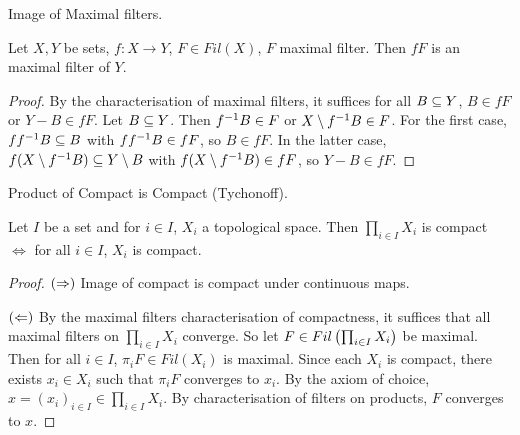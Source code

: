 \documentclass[main.tex]{subfiles}
\begin{document}
\begin{lem} Image of Maximal filters.
  
  Let $X,Y$ be sets, $f : X \to Y$, $F \in Fil(X)$, $F$ maximal filter.
  Then $f F$ is an maximal filter of $Y$. 
\end{lem}
\begin{proof}
  By the characterisation of maximal filters, 
  it suffices for all $B \subseteq Y$, $B \in fF$ or $Y\minus B \in fF$.
  Let $B \subseteq Y$.
  Then $f^{-1} B \in F$ or $X\setminus f^{-1} B \in F$.
  For the first case, $f f^{-1} B \subseteq B$ with $f f^{-1} B \in fF$,
  so $B \in fF$.
  In the latter case, $f(X\setminus f^{-1} B) \subseteq Y\setminus B$ with 
  $f(X\setminus f^{-1} B) \in fF$, so $Y\minus B \in fF$.
\end{proof}

\begin{thm} Product of Compact is Compact (Tychonoff).
  
  Let $I$ be a set and for $i \in I$, $X_i$ a topological space.
  Then $\prod_{i \in I} X_i$ is compact $\iff$
  for all $i \in I$, $X_i$ is compact. 
\end{thm}
\begin{proof}
  $(\Rightarrow)$ Image of compact is compact under continuous maps.

  $(\Leftarrow)$ By the maximal filters characterisation of compactness,
  it suffices that all maximal filters on $\prod_{i \in I} X_i$ converge.
  So let $F \in Fil\left(\prod_{i \in I} X_i\right)$ be maximal.
  Then for all $i \in I$, $\pi_i F \in Fil(X_i)$ is maximal.
  Since each $X_i$ is compact, 
  there exists $x_i \in X_i$ such that $\pi_i F$ converges to $x_i$.
  By the axiom of choice, 
  $x = (x_i)_{i\in I} \in \prod_{i \in I} X_i$.
  By characterisation of filters on products, 
  $F$ converges to $x$.
\end{proof}
\end{document}
